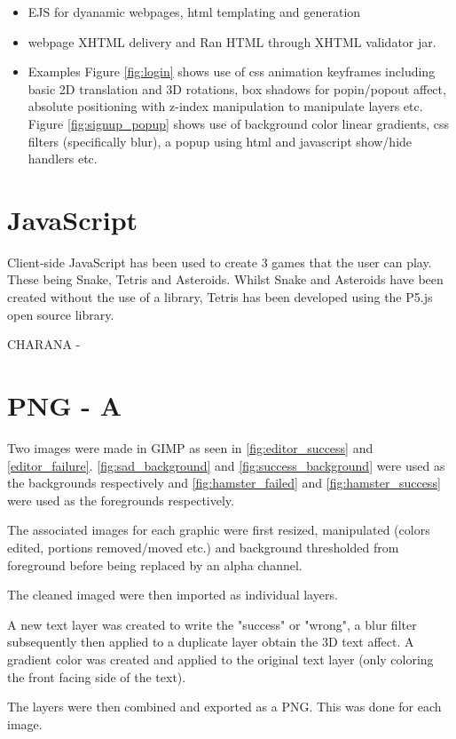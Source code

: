 \documentclass[a4paper]{article}
\begin{document}
\begin {itemize}
	\item EJS for dyanamic webpages, html templating and generation
    \item webpage XHTML delivery and Ran HTML through XHTML validator jar.
    \item Examples
    	\subitem Figure \ref{fig:login} shows use of css animation keyframes including basic 2D translation and 3D rotations, box shadows for popin/popout affect, absolute positioning with z-index manipulation to manipulate layers etc.
        \subitem Figure \ref{fig:signup_popup} shows use of background color linear gradients, css filters (specifically blur), a popup using html and javascript show/hide handlers  etc.
\end {itemize}

\section{JavaScript}
Client-side JavaScript has been used to create 3 games that the user can play.
These being Snake, Tetris and Asteroids. Whilst Snake and Asteroids have been created
without the use of a library, Tetris has been developed using the P5.js open
source library.

CHARANA - 

\section{PNG - A}

Two images were made in GIMP as seen in \ref{fig:editor_success} and \ref{editor_failure}.
\ref{fig:sad_background} and \ref{fig:success_background} were used as the backgrounds respectively and \ref{fig:hamster_failed} and \ref{fig:hamster_success} were used as the foregrounds respectively.

The associated images for each graphic were first resized, manipulated (colors edited, portions removed/moved etc.) and background thresholded from foreground before being replaced by an alpha channel.

The cleaned imaged were then imported as individual layers.

A new text layer was created to write the "success" or "wrong", a blur filter subsequently then applied to a duplicate layer obtain the 3D text affect.
A gradient color was created and applied to the original text layer (only coloring the front facing side of the text).

The layers were then combined and exported as a PNG.
This was done for each image.
\end{document}
